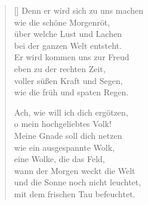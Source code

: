 \begin{multicols}{2}
\begin{verse}[\versewidth]
 Denn er wird sich zu uns machen\\
wie die schöne Morgenröt,\\
über welche Lust und Lachen\\
bei der ganzen Welt entsteht.\\
Er wird kommen uns zur Freud\\
eben zu der rechten Zeit,\\
voller süßen Kraft und Segen,\\
wie die früh und spaten Regen.

 Ach, wie will ich dich ergötzen,\\
o mein hochgeliebtes Volk!\\
Meine Gnade soll dich netzen\\
wie ein ausgespannte Wolk,\\
eine Wolke, die das Feld,\\
wann der Morgen weckt die Welt\\
und die Sonne noch nicht leuchtet,\\
mit dem frischen Tau befeuchtet.

\end{verse}
\end{multicols}
